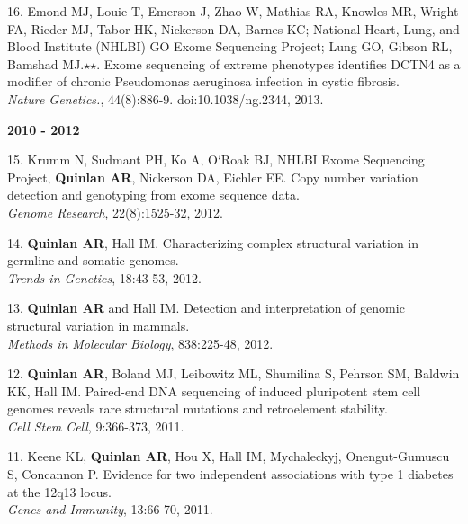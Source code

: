 \documentclass[margin,line]{cv}
\begin{document}
\begin{resume}
\begin{list}{*}{}
    \item[16.] Emond MJ, Louie T, Emerson J, Zhao W, Mathias RA, Knowles MR, Wright FA, Rieder MJ, Tabor HK, Nickerson DA, Barnes KC; National Heart, Lung, and Blood Institute (NHLBI) GO Exome Sequencing Project; Lung GO, Gibson RL, Bamshad MJ.$\star$$\star$. Exome sequencing of extreme phenotypes identifies DCTN4 as a modifier of chronic Pseudomonas aeruginosa infection in cystic fibrosis.\\
    \emph{Nature Genetics.}, 44(8):886-9. doi:10.1038/ng.2344, 2013.

    \end{list}

    \textbf{2010 - 2012} \\
    \begin{list}{*}{}

    \item[15.] Krumm N, Sudmant PH, Ko A, O`Roak BJ, NHLBI Exome Sequencing Project,
    \textbf{Quinlan AR}, Nickerson DA, Eichler EE.
    Copy number variation detection and genotyping from exome sequence data.\\
    \textit{Genome Research}, 22(8):1525-32, 2012.

    \item[14.] \textbf{Quinlan AR}, Hall IM.
    Characterizing complex structural variation in germline and somatic genomes.\\
    \textit{Trends in Genetics}, 18:43-53, 2012.

    \item[13.] \textbf{Quinlan AR} and Hall IM.
    Detection and interpretation of genomic structural variation in mammals.\\
    \textit{Methods in Molecular Biology}, 838:225-48, 2012.

    \item[12.] \textbf{Quinlan AR}, Boland MJ, Leibowitz ML, Shumilina S, Pehrson SM, Baldwin KK, Hall IM.
    Paired-end DNA sequencing of induced pluripotent stem cell genomes reveals
    rare structural mutations and retroelement stability.\\
    \textit{Cell Stem Cell}, 9:366-373, 2011.

    \item[11.] Keene KL, \textbf{Quinlan AR}, Hou X, Hall IM, Mychaleckyj, Onengut-Gumuscu S, Concannon P.
    Evidence for two independent associations with type 1 diabetes at the 12q13 locus.\\
    \textit{Genes and Immunity}, 13:66-70, 2011.


\end{list}
\end{resume}
\end{document}
